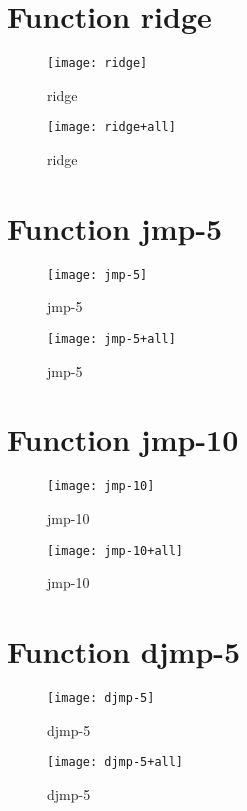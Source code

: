 \section{Function ridge}
\begin{center}

\end{center}
\begin{center}

\end{center}
\begin{figure}[h]
\centering
\texttt{[image: ridge]}
\caption{ridge}
\end{figure}
\begin{figure}[h]
\centering
\texttt{[image: ridge+all]}
\caption{ridge}
\end{figure}
\newpage
\section{Function jmp-5}
\begin{center}

\end{center}
\begin{center}

\end{center}
\begin{figure}[h]
\centering
\texttt{[image: jmp-5]}
\caption{jmp-5}
\end{figure}
\begin{figure}[h]
\centering
\texttt{[image: jmp-5+all]}
\caption{jmp-5}
\end{figure}
\newpage
\section{Function jmp-10}
\begin{center}

\end{center}
\begin{center}

\end{center}
\begin{figure}[h]
\centering
\texttt{[image: jmp-10]}
\caption{jmp-10}
\end{figure}
\begin{figure}[h]
\centering
\texttt{[image: jmp-10+all]}
\caption{jmp-10}
\end{figure}
\newpage
\section{Function djmp-5}
\begin{center}

\end{center}
\begin{center}

\end{center}
\begin{figure}[h]
\centering
\texttt{[image: djmp-5]}
\caption{djmp-5}
\end{figure}
\begin{figure}[h]
\centering
\texttt{[image: djmp-5+all]}
\caption{djmp-5}
\end{figure}
\newpage
